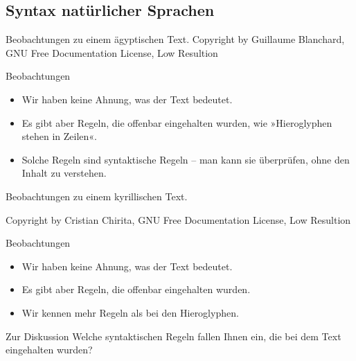 \subsection[Syntax \protect\\ natürlicher Sprachen]{Syntax natürlicher Sprachen}

\begin{frame}{Beobachtungen zu einem ägyptischen Text.}
  {Copyright by Guillaume Blanchard, GNU Free Documentation License, Low Resultion}

  \begin{block}{Beobachtungen}
    \begin{itemize}
    \item Wir haben keine Ahnung, was der Text bedeutet.
    \item Es gibt aber \alert{Regeln}, die offenbar eingehalten wurden,
      wie »Hieroglyphen stehen in Zeilen«.
    \item Solche Regeln sind \alert{syntaktische Regeln} -- man kann sie
      überprüfen, ohne den Inhalt zu verstehen.
    \end{itemize}
  \end{block}
\end{frame}


\begin{frame}{Beobachtungen zu einem kyrillischen Text.}

  {Copyright by Cristian Chirita, GNU Free Documentation License, Low Resultion}

  \begin{block}{Beobachtungen}
    \begin{itemize}
    \item Wir haben keine Ahnung, was der Text bedeutet.
    \item Es gibt aber \alert{Regeln}, die offenbar eingehalten wurden.
    \item Wir kennen mehr Regeln als bei den Hieroglyphen.
    \end{itemize}
  \end{block}

  \begin{block}{Zur Diskussion}
    Welche syntaktischen Regeln fallen Ihnen ein, die bei dem Text
    eingehalten wurden?
  \end{block}
\end{frame}



